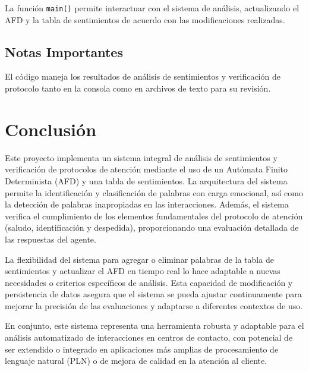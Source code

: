 \documentclass[12pt,a4paper]{article}
\begin{document}
La función \texttt{main()} permite interactuar con el sistema de análisis, actualizando el AFD y la tabla de sentimientos de acuerdo con las modificaciones realizadas.

\subsection*{Notas Importantes}
El código maneja los resultados de análisis de sentimientos y verificación de protocolo tanto en la consola como en archivos de texto para su revisión.


\section{Conclusión}

Este proyecto implementa un sistema integral de análisis de sentimientos y verificación de protocolos de atención mediante el uso de un Autómata Finito Determinista (AFD) y una tabla de sentimientos. La arquitectura del sistema permite la identificación y clasificación de palabras con carga emocional, así como la detección de palabras inapropiadas en las interacciones. Además, el sistema verifica el cumplimiento de los elementos fundamentales del protocolo de atención (saludo, identificación y despedida), proporcionando una evaluación detallada de las respuestas del agente.

La flexibilidad del sistema para agregar o eliminar palabras de la tabla de sentimientos y actualizar el AFD en tiempo real lo hace adaptable a nuevas necesidades o criterios específicos de análisis. Esta capacidad de modificación y persistencia de datos asegura que el sistema se pueda ajustar continuamente para mejorar la precisión de las evaluaciones y adaptarse a diferentes contextos de uso.

En conjunto, este sistema representa una herramienta robusta y adaptable para el análisis automatizado de interacciones en centros de contacto, con potencial de ser extendido o integrado en aplicaciones más amplias de procesamiento de lenguaje natural (PLN) o de mejora de calidad en la atención al cliente.
\end{document}
